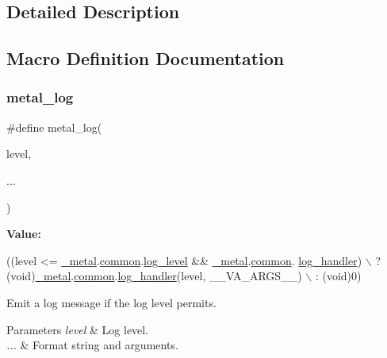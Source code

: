 \subsection{Detailed Description}


\subsection{Macro Definition Documentation}
\mbox{\label{group__logging_ga2713c6e89935c7618532bf3e418e8dd9}} 
\subsubsection{\texorpdfstring{metal\+\_\+log}{metal\_log}}
{\footnotesize\ttfamily \#define metal\+\_\+log(\begin{DoxyParamCaption}\item[{}]{level,  }\item[{}]{... }\end{DoxyParamCaption})}

{\bfseries Value\+:}
\begin{DoxyCode}
((level <= \hyperlink{group__system_ga929f8594b076a54b9773b4ab8ca2327d}{\_metal}.\hyperlink{structmetal__state_aa36ac30ed6ef6439baea425191af0968}{common}.\hyperlink{structmetal__common__state_a326c2fb27f8d538f7501d02bd6c3a851}{log\_level} && \hyperlink{group__system_ga929f8594b076a54b9773b4ab8ca2327d}{\_metal}.\hyperlink{structmetal__state_aa36ac30ed6ef6439baea425191af0968}{common}.
      \hyperlink{structmetal__common__state_abc8928c9100135369eeba2900ba860ea}{log\_handler}) \(\backslash\)
               ? (\textcolor{keywordtype}{void})\hyperlink{group__system_ga929f8594b076a54b9773b4ab8ca2327d}{\_metal}.\hyperlink{structmetal__state_aa36ac30ed6ef6439baea425191af0968}{common}.\hyperlink{structmetal__common__state_abc8928c9100135369eeba2900ba860ea}{log\_handler}(level, \_\_VA\_ARGS\_\_)            \(\backslash\)
               : (void)0)
\end{DoxyCode}
Emit a log message if the log level permits.


\begin{DoxyParams}{Parameters}
{\em level} & Log level. \\
\hline
{\em ...} & Format string and arguments. \\
\hline
\end{DoxyParams}


